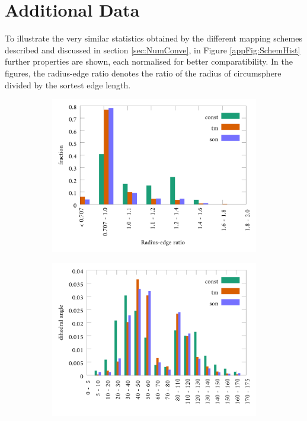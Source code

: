 \section{Additional Data}
To illustrate the very similar statistics obtained by the different mapping schemes described and discussed in section \ref{sec:NumConve}, in Figure \ref{appFig:SchemHist} further properties are shown, each normalised for better comparatibility.
In the figures, the radius-edge ratio denotes the ratio of the radius of circumsphere divided by the sortest edge length.
\begin{figure}
\begin{subfigure}{0.5\textwidth}
\includegraphics[width=\textwidth]{Figures/App/Rad_histAp1.pdf}
\end{subfigure}
\begin{subfigure}{0.5\textwidth}
\includegraphics[width=\textwidth]{Figures/App/Rad_histAp2.pdf}

\end{subfigure}
\end{figure}
